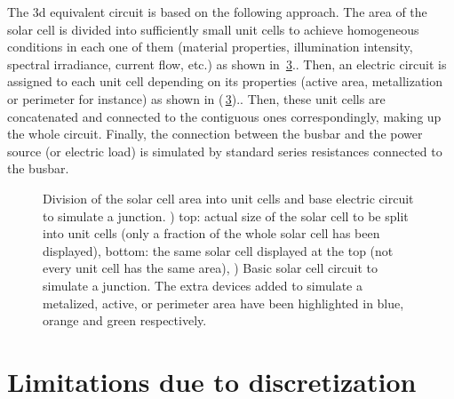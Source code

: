 The \gls{3d} equivalent circuit is based on the following approach. The area of the solar cell is divided into sufficiently small unit cells to achieve homogeneous conditions in each one of them (material properties, illumination intensity, spectral irradiance, current flow, etc.) as shown in \fig\,\ref{fig:AppA_Circuits}.. Then, an electric circuit is assigned to each unit cell depending on its properties (active area, metallization or perimeter for instance) as shown in (\fig\,\ref{fig:AppA_Circuits}).. Then, these unit cells are concatenated and connected to the contiguous ones correspondingly, making up the whole circuit. Finally, the connection between the busbar and the power source (or electric load) is simulated by standard series resistances connected to the busbar. 

\begin{figure}
	\hspace{0.025\textwidth}
	\centering
	\begin{subfigure}[t]{0.4\textwidth}
        \centering
        \caption{}
        \label{fig:AppA_Grid}
    \end{subfigure}
	\begin{subfigure}[t]{0.45\textwidth}
        \centering       
        \caption{}		
		\label{fig:AppA_BaseCircuit}
    \end{subfigure}
	\caption[Division of the solar cell area into unit cells and base electric circuit to simulate a \pn{} junction.]{Division of the solar cell area into unit cells and base electric circuit to simulate a \pn{} junction. ) top: actual size of the solar cell to be split into unit cells (only a fraction of the whole solar cell has been displayed), bottom: the same solar cell displayed at the top (not every unit cell has the same area), ) Basic solar cell circuit to simulate a \pn{} junction. The extra devices added to simulate a metalized, active, or perimeter area have been highlighted in blue, orange and green respectively.}
    \label{fig:AppA_Circuits} 
\end{figure}

\section{Limitations due to discretization}
